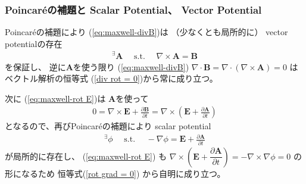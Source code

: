 \subsubsection{Poincar\'eの補題と
  Scalar Potential、
  Vector Potential}

Poincar\'eの補題により
(\ref{eq:maxwell-divB})は
（少なくとも局所的に）
vector potentialの存在
\begin{align}
  {}^\exists
  \bm{A}
\quad
\text{ s.t. }
\quad
  \nabla \times \bm{A}
=
  \bm{B}
\end{align}
を保証し、
逆に$\bm{A}$を使う限り
(\ref{eq:maxwell-divB})
$\nabla \cdot \bm{B}
= \nabla \cdot
(\nabla \times \bm{A})
= 0$
はベクトル解析の恒等式
(\ref{div rot = 0})から常に成り立つ。

次に
(\ref{eq:maxwell-rot E})は
$\bm{A}$を使って
\begin{align}
  0 =
  \nabla \times \bm{E}
  +
  \frac{\partial \bm{B}}
    {\partial t}
=
  \nabla \times
  \left(
    \bm{E}
    +
    \frac{\partial \bm{A}}
      {\partial t}      
  \right)
\end{align}
となるので、再びPoincar\'eの補題により
scalar potential
\begin{align}
  {}^\exists \phi
\quad
\text{ s.t. }
\quad
  - \nabla \phi
=
  \bm{E}
  +
  \frac{\partial \bm{A}}
    {\partial t}
\end{align}
が局所的に存在し、
(\ref{eq:maxwell-rot E})
も
$\nabla \times
\left(
  \bm{E} +
  \dfrac{\partial \bm{A}}
    {\partial t}
\right)
= - \nabla \times \nabla \phi
= 0$
の形になるため
恒等式(\ref{rot grad = 0})
から自明に成り立つ。


